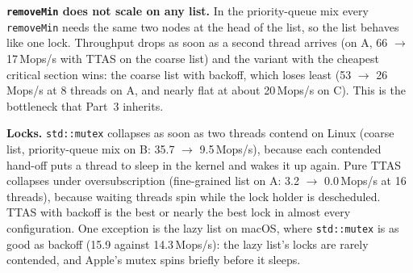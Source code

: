 \textbf{\texttt{removeMin} does not scale on any list.} In the priority-queue
mix every \texttt{removeMin} needs the same two nodes at the head of the list,
so the list behaves like one lock. Throughput drops as soon as a second thread
arrives (on A, 66 $\rightarrow$ 17\,Mops/s with TTAS on the coarse list) and
the variant with the cheapest critical section wins: the coarse list with
backoff, which loses least (53 $\rightarrow$ 26\,Mops/s at 8 threads on A,
and nearly flat at about 20\,Mops/s on C). This is the bottleneck that Part~3
inherits.

\textbf{Locks.} \texttt{std::mutex} collapses as soon as two threads contend on
Linux (coarse list, priority-queue mix on B: 35.7 $\rightarrow$
9.5\,Mops/s), because each contended hand-off puts a thread to sleep in the
kernel and wakes it up again. Pure TTAS collapses under oversubscription
(fine-grained list on A: 3.2 $\rightarrow$ 0.0\,Mops/s at 16 threads),
because waiting threads spin while the lock holder is descheduled. TTAS with
backoff is the best or nearly the best lock in almost every configuration. One
exception is the lazy list on macOS, where \texttt{std::mutex} is as good as
backoff (15.9 against 14.3\,Mops/s): the lazy list's locks are rarely
contended, and Apple's mutex spins briefly before it sleeps.
